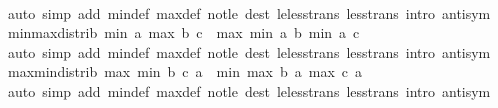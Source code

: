 \begin{isabellebody}
%
\isadelimproof
\ \ %
\endisadelimproof
%
\isatagproof
{}\isamarkupfalse%
\ {\isacharparenleft}{\kern0pt}auto\ simp\ add{\isacharcolon}{\kern0pt}\ min{\isacharunderscore}{\kern0pt}def\ max{\isacharunderscore}{\kern0pt}def\ not{\isacharunderscore}{\kern0pt}le\ dest{\isacharcolon}{\kern0pt}\ le{\isacharunderscore}{\kern0pt}less{\isacharunderscore}{\kern0pt}trans\ less{\isacharunderscore}{\kern0pt}trans\ intro{\isacharcolon}{\kern0pt}\ antisym{\isacharparenright}{\kern0pt}%
\endisatagproof
{\isafoldproof}%
%
\isadelimproof
\isanewline
%
\endisadelimproof
\isanewline
{}\isamarkupfalse%
\ min{\isacharunderscore}{\kern0pt}max{\isacharunderscore}{\kern0pt}distrib{}{\isacharcolon}{\kern0pt}\ {\isachardoublequoteopen}min\ a\ {\isacharparenleft}{\kern0pt}max\ b\ c{\isacharparenright}{\kern0pt}\ {\isacharequal}{\kern0pt}\ max\ {\isacharparenleft}{\kern0pt}min\ a\ b{\isacharparenright}{\kern0pt}\ {\isacharparenleft}{\kern0pt}min\ a\ c{\isacharparenright}{\kern0pt}{\isachardoublequoteclose}\isanewline
%
\isadelimproof
\ \ %
\endisadelimproof
%
\isatagproof
{}\isamarkupfalse%
\ {\isacharparenleft}{\kern0pt}auto\ simp\ add{\isacharcolon}{\kern0pt}\ min{\isacharunderscore}{\kern0pt}def\ max{\isacharunderscore}{\kern0pt}def\ not{\isacharunderscore}{\kern0pt}le\ dest{\isacharcolon}{\kern0pt}\ le{\isacharunderscore}{\kern0pt}less{\isacharunderscore}{\kern0pt}trans\ less{\isacharunderscore}{\kern0pt}trans\ intro{\isacharcolon}{\kern0pt}\ antisym{\isacharparenright}{\kern0pt}%
\endisatagproof
{\isafoldproof}%
%
\isadelimproof
\isanewline
%
\endisadelimproof
\isanewline
{}\isamarkupfalse%
\ max{\isacharunderscore}{\kern0pt}min{\isacharunderscore}{\kern0pt}distrib{}{\isacharcolon}{\kern0pt}\ {\isachardoublequoteopen}max\ {\isacharparenleft}{\kern0pt}min\ b\ c{\isacharparenright}{\kern0pt}\ a\ {\isacharequal}{\kern0pt}\ min\ {\isacharparenleft}{\kern0pt}max\ b\ a{\isacharparenright}{\kern0pt}\ {\isacharparenleft}{\kern0pt}max\ c\ a{\isacharparenright}{\kern0pt}{\isachardoublequoteclose}\isanewline
%
\isadelimproof
\ \ %
\endisadelimproof
%
\isatagproof
{}\isamarkupfalse%
\ {\isacharparenleft}{\kern0pt}auto\ simp\ add{\isacharcolon}{\kern0pt}\ min{\isacharunderscore}{\kern0pt}def\ max{\isacharunderscore}{\kern0pt}def\ not{\isacharunderscore}{\kern0pt}le\ dest{\isacharcolon}{\kern0pt}\ le{\isacharunderscore}{\kern0pt}less{\isacharunderscore}{\kern0pt}trans\ less{\isacharunderscore}{\kern0pt}trans\ intro{\isacharcolon}{\kern0pt}\ antisym{\isacharparenright}{\kern0pt}%
\endisatagproof
{\isafoldproof}%

\end{isabellebody}
